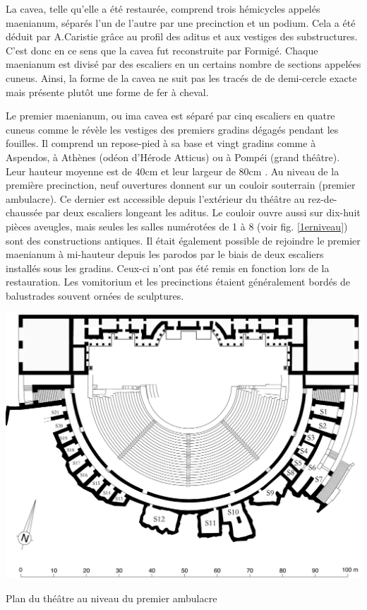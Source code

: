 		La  \gls{cavea}, telle qu'elle a été restaurée, comprend trois hémicycles appelés \gls{maenianum}, séparés l'un de l'autre par une \gls{precinction} et un \gls{podium}. Cela a été déduit par A.Caristie grâce au profil des \gls{aditus} et aux vestiges des substructures. C'est donc en ce sens que la  \gls{cavea} fut reconstruite par Formigé. Chaque \gls{maenianum} est divisé par des escaliers en un certains nombre de sections appelées \gls{cuneus}. Ainsi, la forme de la \gls{cavea} ne suit pas les tracés de \cite{vitruve} de demi-cercle exacte mais présente plutôt une forme de fer à cheval.
		
		Le premier \gls{maenianum}, ou  \gls{ima cavea} est séparé par cinq escaliers en quatre \gls{cuneus} comme le révèle les vestiges des premiers gradins dégagés pendant les fouilles. Il comprend un repose-pied à sa base et vingt gradins comme à Aspendos, à Athènes (odéon d'Hérode Atticus) ou à Pompéi (grand théâtre). Leur hauteur moyenne est de 40cm et leur largeur de 80cm \cite{formige}. Au niveau de la première \gls{precinction}, neuf ouvertures donnent  sur un couloir souterrain (premier \gls{ambulacre}). Ce dernier est accessible depuis l'extérieur du théâtre au rez-de-chaussée par deux escaliers longeant les \gls{aditus}. Le couloir ouvre aussi sur dix-huit pièces aveugles, mais seules les salles numérotées de 1 à 8 (voir fig. \ref{1erniveau}) sont des constructions antiques. Il était également possible de rejoindre le premier \gls{maenianum} à mi-hauteur depuis les \gls{parodos} par le biais de deux escaliers installés sous les gradins. Ceux-ci n'ont pas été remis en fonction lors de la restauration. Les \gls{vomitorium} et les \glspl{precinction} étaient généralement bordés de balustrades souvent ornées de sculptures.
		
	\begin{figureth}
		\includegraphics[width=\linewidth]{images/1erniveau}
		\caption[Vue de dessus - 1er niveau]{Plan du théâtre au niveau du premier \gls{ambulacre} \footnotemark }
		\label{1erniveau}
	\end{figureth}		
	
